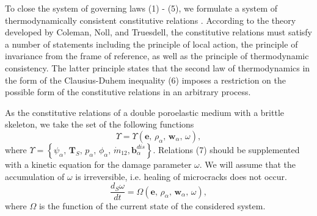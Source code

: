 \documentclass[article,authoryear,jpm]{beg_39}             %
\begin{document}
To close the system of governing laws (1) - (5), we formulate a system of thermodynamically consistent constitutive relations \cite{Truesdell}.
According to the theory developed by Coleman, Noll, and Truesdell, the constitutive relations must satisfy a number of statements including the principle of local action, the principle of invariance from the frame of reference, as well as the principle of thermodynamic consistency.
The latter principle states that the second law of thermodynamics in the form of the Clausius-Duhem inequality (6) imposes a restriction on the possible form of the constitutive relations in an arbitrary process.

As the constitutive relations of a double poroelastic medium with a brittle skeleton, we take the set of the following functions
\begin{equation}
\Upsilon =\Upsilon \left( \mathbf{e},\,{{\rho }_{\alpha }},\,{{\mathbf{w}}_{\alpha }},\,\omega \right),
\end{equation}
where $\Upsilon =\left\{ {{\psi }_{\alpha }},\,{{\mathbf{T}}_{S}},\,{{p}_{\alpha }},\,{{\phi }_{\alpha }},\,{{{\dot{m}}}_{12}},\mathbf{b}_{\alpha }^{dis} \right\}$. Relations (7) should be supplemented with a kinetic equation for the damage parameter $\omega$. We will assume that the accumulation of $\omega$ is irreversible, i.e. healing of microcracks does not occur.
\begin{equation}
\frac{{{d}_{S}}\omega }{dt}=\Omega \left( \mathbf{e},\,{{\rho }_{\alpha }},\,{{\mathbf{w}}_{\alpha }},\,\omega \right),
\end{equation}
where $\Omega$ is the function of the current state of the considered system.
\end{document}
